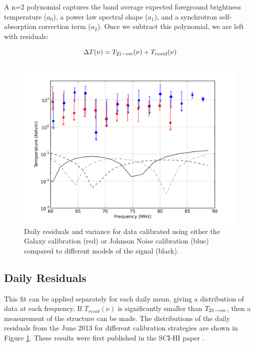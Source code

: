 A n=2 polynomial captures the band average expected foreground brightness temperature ($a_0$), a power law spectral shape ($a_1$), and a synchrotron self-absorption correction term ($a_2$). Once we subtract this polynomial, we are left with residuals:

\begin{equation}
\Delta T (\nu) = T_{21-cm}(\nu)+T_{resid}(\nu)
\end{equation}

\begin{figure}[htb]
\begin{center}
\includegraphics[width=0.95\linewidth]{Data_analysis/figures/joint_log_means.png}
\caption{Daily residuals and variance for data calibrated using either the Galaxy calibration (red) or Johnson Noise calibration (blue) compared to different models of the \cm signal (black). }
\label{Fig:resid}
\end{center}
\end{figure}

\subsection{Daily Residuals}
This fit can be applied separately for each daily mean, giving a distribution of data at each frequency. If $T_{resid}(\nu)$ is significantly smaller than $T_{21-cm}$, then a measurement of the \cm structure can be made. The distributions of the daily residuals from the June 2013 for different calibration strategies are shown in Figure \ref{Fig:resid}. These results were first published in the SCI-HI paper \cite{Voytek_2014}.  

